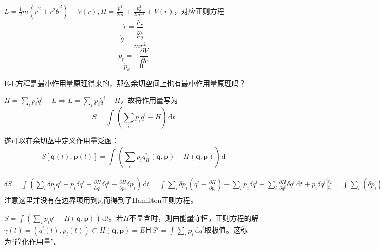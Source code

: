 \documentclass{ctexbook}
\begin{document}
\begin{Eg}
  $L=\frac{1}{2}m(\dot{r}^2 +r^2 \dot{\theta}^2)-V(r), H= \frac{p_r^2}{2m}+\frac{p_{\theta}^2}{2mr^2}+V(r)$，对应正则方程
  \begin{equation*}
\dot{r}=\frac{p_r}{m}
\end{equation*}
\begin{equation*}
\dot{\theta}=\frac{p_{\theta}}{mr^2}
\end{equation*}
\begin{equation*}
\dot{p}_r=-\frac{\partial V}{\partial r}
\end{equation*}
\begin{equation*}
\dot{p}_{\theta}=0
\end{equation*}


\end{Eg}

E-L方程是最小作用量原理得来的，那么余切空间上也有最小作用量原理吗？

$H=\sum\limits_i^{}p_i\dot{q}^i-L \Rightarrow L=\sum\limits_i^{} p_i\dot{q}^i -H$，故将作用量写为
\begin{equation*}
S=\int_{}^{} \left( \sum\limits_i^{}p_i\dot{q}^i-H \right) \,\mathrm{d}t
\end{equation*}

遂可以在余切丛中定义作用量泛函：
\begin{equation*}
S[\bm{q}(t), \bm{p}(t)]=\int_{}^{} (\sum\limits_{i}^{}p_i \dot{q}^i_H(\bm{q},\bm{p})-H(\bm{q},\bm{p})) \,\mathrm{d}
\end{equation*}

$\delta S= \int_{}^{} \left( \sum\limits_i^{} \delta p_i \dot{q}^i+ p_i \delta \dot{q}^i- \frac{\partial H}{\partial q^{i}}\delta q^i -\frac{\partial H}{\partial p_{i}}\delta p_i \right) \,\mathrm{d}t= \int_{}^{} \sum\limits_i^{}\delta p_i(\dot{q}^i-\frac{\partial H}{\partial p_{i}})-\sum\limits_i^{} \dot{p}_i\delta q^i-\sum\limits_i^{} \frac{\partial H}{\partial q^{i}}\delta q^i \,\mathrm{d}t+ p_i \delta q^i|_{t_1}^{t_2}= \int_{}^{} \sum\limits_i^{}\left( \delta p_i (\dot{q}^i-\frac{\partial H}{\partial p_{i}})- \delta q^i (\dot{p}_i+\frac{\partial H}{\partial q^{i}}) \right) \,\mathrm{d}t + p_i\delta q_i|_{t_1}^{t_2}$
注意这里并没有在边界项用到$\dot{p}_i$而得到了Hamilton正则方程。

\begin{Cor}
  $S=\int_{}^{} \left( \sum\limits_i^{} p_iq^i-H(\bm{q},\bm{p}) \right) \,\mathrm{d}t$。若$H$不显含时，则由能量守恒，正则方程的解$\gamma(t)= (q^i(t),p_i(t))\subset H(\bm{q},\bm{p})=E$且$S'= \int_{}^{} \sum\limits_i^{} p_i  \,\mathrm{d}q^i$取极值。这称为“简化作用量”。
\end{Cor}
\end{document}

